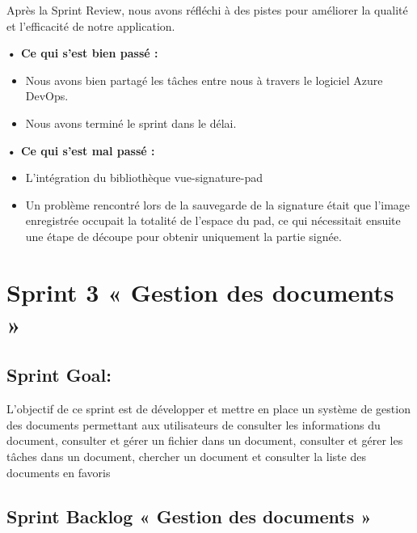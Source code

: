 Après la Sprint Review, nous avons réfléchi à des pistes pour améliorer la qualité et l'efficacité de notre application.

\noindent\textbf{•	Ce qui s'est bien passé :}
\begin{itemize}
  \item Nous avons bien partagé les tâches entre nous à travers le logiciel Azure DevOps. 
  \item Nous avons terminé le sprint dans le délai.
\end{itemize}

\noindent\textbf{•	Ce qui s'est mal passé :}
\begin{itemize}
  \item L'intégration du bibliothèque vue-signature-pad
  \item Un problème rencontré lors de la sauvegarde de la signature était que l'image enregistrée occupait la totalité de l'espace du pad, ce qui nécessitait ensuite une étape de découpe pour obtenir uniquement la partie signée.
\end{itemize}

\section{Sprint 3 « Gestion des documents »}
\subsection{Sprint Goal:}

L'objectif de ce sprint est de développer et mettre en place un système de gestion des documents permettant aux utilisateurs de consulter les informations du document, consulter et gérer un fichier dans un document, consulter et gérer les tâches dans un document, chercher un document et consulter la liste des documents en favoris

\pagebreak

\subsection{Sprint Backlog « Gestion des documents »}

